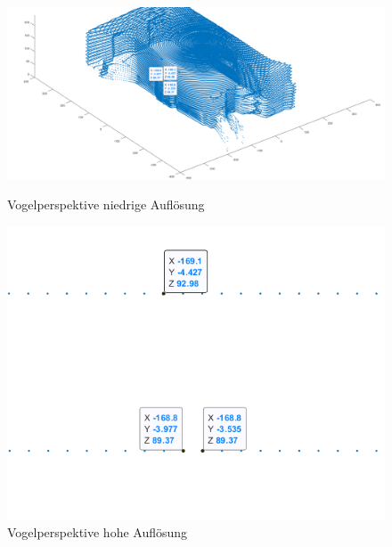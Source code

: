 \begin{figure}[htb]
	\centering
	\begin{minipage}[t]{0.45\linewidth}
		\centering
		\includegraphics[width=1.2\linewidth]{images/Validierung/Aufloesungen/3Messwerte_Ansicht.png}
		\caption{Vogelperspektive niedrige Auflösung}
		\label{vogasdasdel niedrigeAuflösung}
	\end{minipage}
	\hfill
	\begin{minipage}[t]{0.45\linewidth}
		\centering
		\includegraphics[width=1.2\linewidth]{images/Validierung/Aufloesungen/3Label.png}
		\caption{Vogelperspektive hohe Auflösung}
		\label{vogel hoheAsadasduflösung}
	\end{minipage}
\end{figure}


